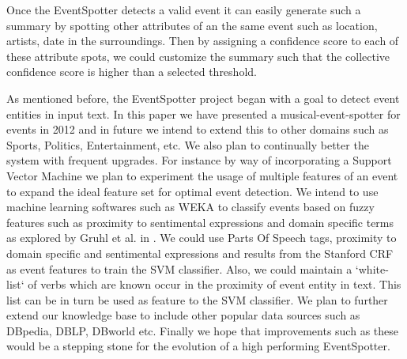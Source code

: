 \documentclass[a4paper,11pt]{report}
\begin{document}
\newline
Once the EventSpotter detects a valid event it can easily generate such a summary by spotting other attributes of an the same event such as location, artists, date in the surroundings. Then by assigning a confidence score to each of these attribute spots, we could customize the summary such that the collective confidence score is higher than a selected threshold.

As mentioned before, the EventSpotter project began with a goal to detect event entities in input text. In this paper we have presented a musical-event-spotter for events in 2012 and in future we intend to extend this to other domains such as Sports, Politics, Entertainment, etc. We also plan to continually better the system with frequent upgrades. For instance by way of incorporating a Support Vector Machine we plan to experiment the usage of multiple features of an event to expand the ideal feature set for optimal event detection. We intend to use machine learning softwares such as WEKA to classify events based on fuzzy features such as proximity to sentimental expressions and domain specific terms as explored by Gruhl et al. in \cite{Gruhl_contextand}. We could use Parts Of Speech tags, proximity to domain specific and sentimental expressions and results from the Stanford CRF as event features to train the SVM classifier. Also, we could maintain a `white-list` of verbs which are known occur in the proximity of event entity in text. This list can be in turn be used as feature to the SVM classifier. We plan to further extend our knowledge base to include other popular data sources such as DBpedia, DBLP, DBworld etc. Finally we hope that improvements such as these would be a stepping stone for the evolution of a high performing EventSpotter.

{}
\end{document}
